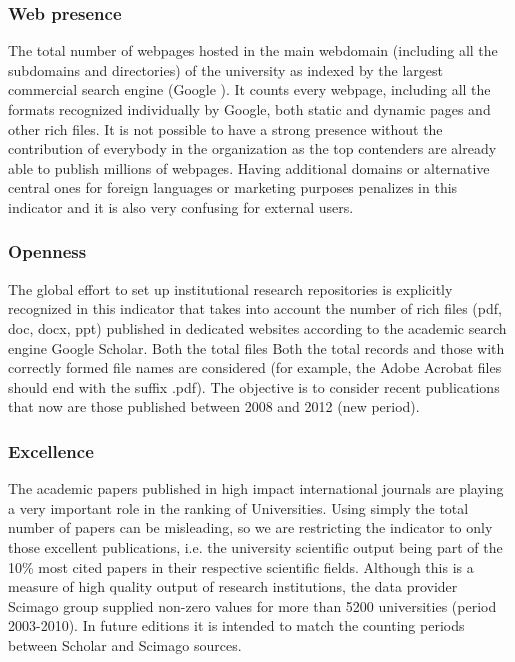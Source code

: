 \subsubsection{Web presence}
The total number of webpages hosted in the main webdomain (including all the subdomains and directories) of the university as indexed by the largest commercial search engine (Google ). It counts every webpage, including all the formats recognized individually by Google, both static and dynamic pages and other rich files. It is not possible to have a strong presence without the contribution of everybody in the organization as the top contenders are already able to publish millions of webpages. Having additional domains or alternative central ones for foreign languages or marketing purposes penalizes in this indicator and it is also very confusing for external users.

\subsubsection{Openness}
The global effort to set up institutional research repositories is explicitly recognized in this indicator that takes into account the number of rich files (pdf, doc, docx, ppt) published in dedicated websites according to the academic search engine Google Scholar. Both the total files Both the total records and those with correctly formed file names are considered (for example, the Adobe Acrobat files should end with the suffix .pdf). The objective is to consider recent publications that now are those published between 2008 and 2012 (new period).

\subsubsection{Excellence}
The academic papers published in high impact international journals are playing a very important role in the ranking of Universities. Using simply the total number of papers can be misleading, so we are restricting the indicator to only those excellent publications, i.e. the university scientific output being part of the 10\% most cited papers in their respective scientific fields. Although this is a measure of high quality output of research institutions, the data provider Scimago group supplied non-zero values for more than 5200 universities (period 2003-2010). In future editions it is intended to match the counting periods between Scholar and Scimago sources.

